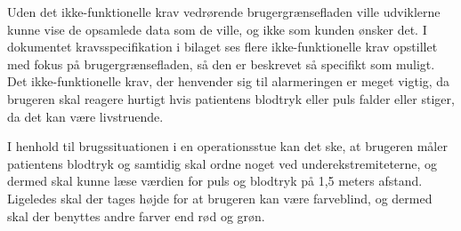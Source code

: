 Uden det ikke-funktionelle krav vedrørende brugergrænsefladen ville udviklerne kunne vise de opsamlede data som de ville, og ikke som kunden ønsker det. I dokumentet kravsspecifikation i bilaget ses flere ikke-funktionelle krav opstillet med fokus på brugergrænsefladen, så den er beskrevet så specifikt som muligt. \\


Det ikke-funktionelle krav, der henvender sig til alarmeringen er meget vigtig, da brugeren skal reagere hurtigt hvis patientens blodtryk eller puls falder eller stiger, da det kan være livstruende.

I henhold til brugssituationen i en operationsstue kan det ske, at brugeren måler patientens blodtryk og samtidig skal ordne noget ved underekstremiteterne, og dermed skal kunne læse værdien for puls og blodtryk på 1,5 meters afstand. Ligeledes skal der tages højde for at brugeren kan være farveblind, og dermed skal der benyttes andre farver end rød og grøn.\\